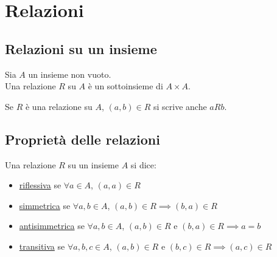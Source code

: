 \documentclass[a4paper,12pt, oneside]{book}
\begin{document}
\chapter{Relazioni}
	\section{Relazioni su un insieme}
		\begin{definizione}
			Sia $A$ un insieme non vuoto.\\
			Una relazione $R$ su $A$ è un sottoinsieme di $A \times A$.
		\end{definizione}
		\begin{nota}
			Se $R$ è una relazione su $A$, $(a,b) \in R$ si scrive anche $aRb$.
		\end{nota}
	\section{Proprietà delle relazioni}
		\begin{definizione}
			Una relazione $R$ su un insieme $A$ si dice:
			\begin{itemize}
				\item \underline{riflessiva} se $\forall a \in A$, $(a,a) \in R$
				\item \underline{simmetrica} se $\forall a,b \in A$, $(a,b) \in R \implies (b,a) \in R$
				\item \underline{antisimmetrica} se $\forall a,b \in A$, $(a,b) \in R$ e $(b,a) \in R \implies a=b$
				\item \underline{transitiva} se $\forall a,b,c \in A$, $(a,b) \in R$ e $(b,c) \in R \implies (a,c) \in R$
			\end{itemize}
		\end{definizione}
\end{document}
